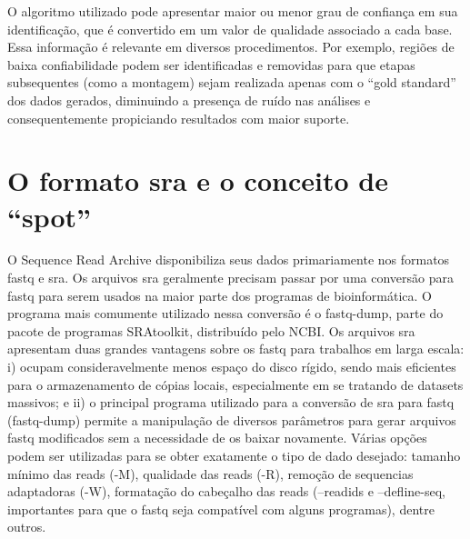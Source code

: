 \documentclass[../DISSERTACAO_MAIN.tex]{subfiles}
\begin{document}
O algoritmo utilizado pode apresentar maior ou menor grau de confiança em sua identificação, que é convertido em um valor de qualidade associado a cada base. Essa informação é relevante em diversos procedimentos. Por exemplo, regiões de baixa confiabilidade podem ser identificadas e removidas para que etapas subsequentes (como a montagem) sejam realizada apenas com o “gold standard” dos dados gerados, diminuindo a presença de ruído nas análises e consequentemente propiciando resultados com maior suporte.


\section{O formato sra e o conceito de ``spot''}

O Sequence Read Archive disponibiliza seus dados primariamente nos formatos fastq e sra. Os arquivos sra geralmente precisam passar por uma conversão para fastq para serem usados na maior parte dos programas de bioinformática. O programa mais comumente utilizado nessa conversão é o fastq-dump, parte do pacote de programas SRAtoolkit, distribuído pelo NCBI. Os arquivos sra apresentam duas grandes vantagens sobre os fastq para trabalhos em larga escala: i) ocupam consideravelmente menos espaço do disco rígido, sendo mais eficientes para o armazenamento de cópias locais, especialmente em se tratando de datasets massivos; e ii) o principal programa utilizado para a conversão de sra para fastq (fastq-dump) permite a manipulação de  diversos parâmetros para gerar arquivos fastq modificados sem a necessidade de os baixar novamente. Várias opções podem ser utilizadas para se obter exatamente o tipo de dado desejado: tamanho mínimo das reads (-M), qualidade das reads (-R), remoção de sequencias adaptadoras (-W), formatação do cabeçalho das reads (--readids e –defline-seq, importantes para que o fastq  seja compatível com alguns programas), dentre outros.
\end{document}

